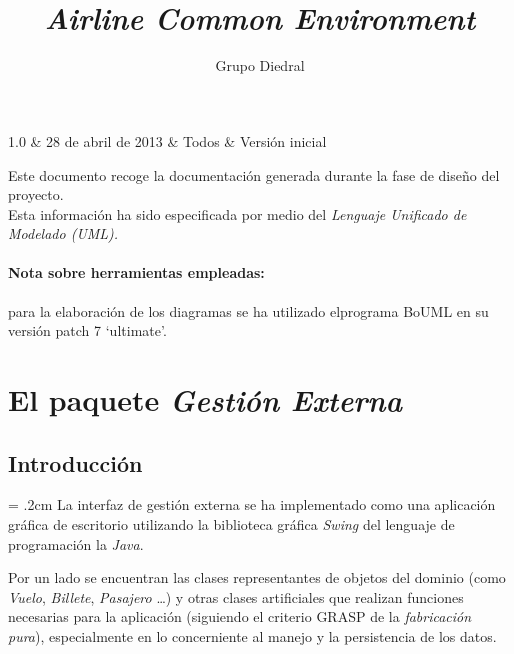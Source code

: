 \documentclass[11pt, a4paper, twoside, titlepage]{article}
\title{\doctitle\\\textsl{Airline Common Environment}}
\author{Grupo Diedral}
\newcommand*{\doctitle}{Diseño}
\newcommand*{\docversion}{1.0}
\begin{document}
	\begin{tablacambios}
		1.0 & 28 de abril de 2013 & Todos & Versión inicial
	\end{tablacambios}


	\portadaace{\doctitle}{\docversion}

	\tableofcontents
	\newpage

	\iniciarnumeraciondiedral

	\begin{prologo}
		Este documento recoge la documentación generada durante la fase de diseño del proyecto.\\

		Esta información ha sido especificada por medio del \itshape{Lenguaje Unificado de Modelado} (UML).

	\paragraph*{Nota sobre herramientas empleadas:} para la elaboración de los diagramas se ha utilizado el\break programa {\normalfont BoUML} en su versión { patch 7 `ultimate'}.
	\end{prologo}

	\section{El paquete {\itshape Gestión Externa}}
		\subsection{Introducción}
			\parskip = .2cm
			La interfaz de gestión externa se ha implementado como una aplicación gráfica de escritorio utilizando la biblioteca gráfica {\itshape Swing} del lenguaje de programación {la \itshape Java}.

			Por un lado se encuentran las clases representantes de objetos del dominio (como \textit{Vuelo}, \textit{Billete}, \textit{Pasajero} \ldots) y otras clases artificiales que realizan funciones necesarias para la aplicación (siguiendo el criterio GRASP de la \textit{fabricación pura}), especialmente en lo concerniente al manejo y la persistencia de los datos.
\end{document}

